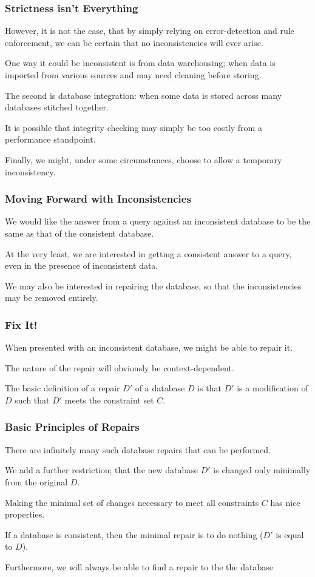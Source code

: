 \begin{frame}
\frametitle{Strictness isn't Everything}

However, it is not the case, that by simply relying on error-detection and rule enforcement, we can be certain that no inconsistencies will ever arise. 

One way it could be inconsistent is from data warehousing; when data is imported from various sources and may need cleaning before storing. 

The second is database integration: when some data is stored across many databases stitched together.

It is possible that integrity checking may simply be too costly from a performance standpoint.

Finally, we might, under some circumstances, choose to allow a temporary inconsistency.

\end{frame}


\begin{frame}
\frametitle{Moving Forward with Inconsistencies}

We would like the answer from a query against an inconsistent database to be the same as that of the consistent database. 

At the very least, we are interested in getting a consistent answer to a query, even in the presence of inconsistent data. 

We may also be interested in repairing the database, so that the inconsistencies may be removed entirely.

\end{frame}


\begin{frame}
\frametitle{Fix It!}

When presented with an inconsistent database, we might be able to repair it. 

The nature of the repair will obviously be context-dependent. 

The basic definition of a repair $D'$ of a database $D$ is that $D'$ is a modification of $D$ such that $D'$ meets the constraint set $C$.


\end{frame}

\begin{frame}
\frametitle{Basic Principles of Repairs}

There are infinitely many such database repairs that can be performed. 

We add a further restriction; that the new database $D'$ is changed only minimally from the original $D$.

Making the minimal set of changes necessary to meet all constraints $C$ has nice properties.

If a database is consistent, then the minimal repair is to do nothing ($D'$ is equal to $D$). 

Furthermore, we will always be able to find a repair to the the database

\end{frame}

